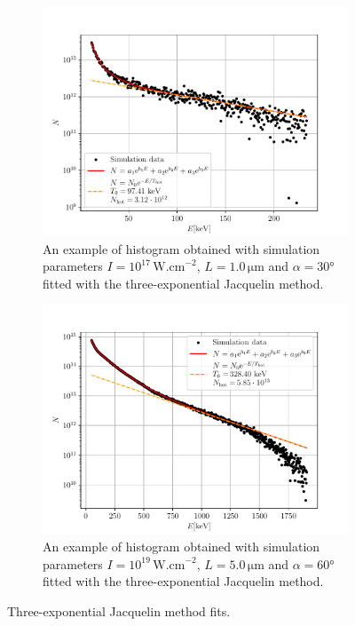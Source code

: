 \begin{figure}[ht]
	\centering
	\begin{subfigure}{0.49\textwidth}
		\centering
		\includegraphics[width=\textwidth]{figures/3exp-ex1}
		\caption{An example of histogram obtained with simulation parameters $I=10^{17}\,\mathrm{W.cm}^{-2}$, $L=1.0\,\mathrm{\mu m}$ and $\alpha = 30$° fitted with the three-exponential Jacquelin method.}
		\label{fig:3exp-ex1-good}
	\end{subfigure}
	\hfill
	\begin{subfigure}{0.49\textwidth}
		\centering
		\includegraphics[width=\textwidth]{figures/3exp-ex2}
		\caption{An example of histogram obtained with simulation parameters $I=10^{19}\,\mathrm{W.cm}^{-2}$, $L=5.0\,\mathrm{\mu m}$ and $\alpha = 60$° fitted with the three-exponential Jacquelin method.}
		\label{fig:3exp-ex2-good}
	\end{subfigure}
	\caption{Three-exponential Jacquelin method fits.}
	\label{fig:3exp-fit-good-example}
\end{figure}

